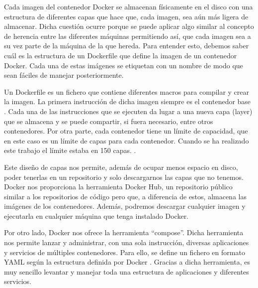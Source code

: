 Cada imagen del contenedor Docker se almacenan físicamente en el disco con una estructura de diferentes capas que hace que, cada imagen, sea aún más ligera de almacenar. Dicha cuestión ocurre porque se puede aplicar algo similar al concepto de herencia entre las diferentes máquinas permitiendo así, que cada imagen sea a su vez parte de la máquina de la que hereda. Para entender esto, debemos saber cuál es la estructura de un Dockerfile que define la imagen de un contenedor Docker. Cada una de estas imágenes se etiquetan con un nombre de modo que sean fáciles de manejar posteriormente.\par

Un Dockerfile es un fichero que contiene diferentes macros para compilar y crear la imagen. La primera instrucción de dicha imagen siempre es el contenedor base \cite{Dck-11}. Cada una de las instrucciones que se ejecuten da lugar a una nueva capa (layer) que se almacena y se puede compartir, si fuera necesario, entre otros contenedores. Por otra parte, cada contenedor tiene un límite de capacidad, que en este caso es un límite de capas para cada contenedor. Cuando se ha realizado este trabajo el límite estaba en 150 capas. \cite{Dck-12}. \par

Este diseño de capas nos permite, además de ocupar menos espacio en disco, poder tenerlas en un repositorio y solo descargarnos las capas que no tenemos. Docker nos proporciona la herramienta Docker Hub, un repositorio público similar a los repositorios de código pero que, a diferencia de estos, almacena las imágenes de los contenedores. Además, podremos descargar cualquier imagen y ejecutarla en cualquier máquina que tenga instalado Docker.\par

Por otro lado, Docker nos ofrece la herramienta “compose”. Dicha herramienta nos permite lanzar y administrar, con una sola instrucción, diversas aplicaciones y servicios de múltiples contenedores. Para ello, se define un fichero en formato YAML según la estructura definida por Docker \cite{Dck-13}. Gracias a dicha herramienta, es muy sencillo levantar y manejar toda una estructura de aplicaciones y diferentes servicios.\par

